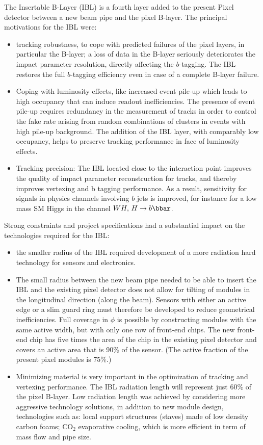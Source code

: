The Insertable B-Layer (IBL) is a fourth layer added to the present Pixel detector between a
new beam pipe and the pixel B-layer. The principal motivations for the IBL were:

\begin{itemize}
\item tracking robustness, to cope with predicted failures of the pixel layers, in particular the B-layer; 
  a loss of data in the B-layer
seriously deteriorates the impact parameter resolution, directly affecting the $b$-tagging. The
IBL restores the full $b$-tagging efficiency even in case of a complete B-layer failure.
  \item Coping with luminosity effects, like increased event pile-up which leads to  high occupancy that can induce readout inefficiencies. The presence of event pile-up requires redundancy in
the measurement of tracks in order to control the fake rate arising from random combinations
of clusters in events with high pile-up background. The addition of the IBL layer, with
comparably low occupancy, helps to preserve tracking performance in face of luminosity
effects.
  \item Tracking precision: The IBL located close to the interaction point improves the quality of
impact parameter reconstruction for tracks, and thereby improves vertexing and b tagging
performance. As a result, sensitivity for signals in physics channels involving $b$ jets is improved,
for instance for a low mass SM Higgs in the channel $WH,\,H\to b\bbar$.
\end{itemize}

Strong constraints and project specifications had a substantial impact on the technologies
required for the IBL:

\begin{itemize}
\item the smaller radius of the IBL required development of a more radiation hard technology for
sensors and electronics.
\item The small radius between the new beam pipe needed to be able to insert the IBL
 and the existing pixel detector does not allow
for tilting of modules in the longitudinal direction (along the beam). Sensors with either
an active edge or a slim guard ring must therefore be developed to reduce geometrical inefficiencies.
Full coverage in $\phi$ is possible by constructing modules with the same active
width, but with only one row of front-end chips. The new front-end chip has five times the
area of the chip in the existing pixel detector and covers an active area that is 90\% of the
sensor. (The active fraction of the present pixel modules is 75\%.)
 \item Minimizing material is very important in the optimization of tracking and vertexing performance.
The IBL radiation length will represent just 60\% of the pixel B-layer. Low
radiation length was achieved by considering more aggressive technology solutions, in addition
to new module design, technologies such as: local support structures (staves) made of low
density carbon foams; CO$_2$ evaporative cooling, which is more efficient in term of mass flow
and pipe size.
\end{itemize}

